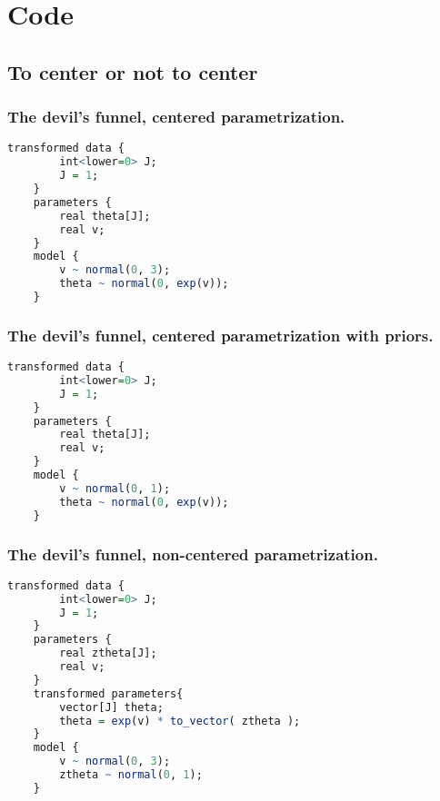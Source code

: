 \chapter{Code}

\section{To center or not to center} \label{app:noncenter}

\subsection{The devil's funnel, centered parametrization.} 
\begin{lstlisting}[language=R]
	transformed data {
		int<lower=0> J;
		J = 1;
	}
	parameters {
		real theta[J];
		real v;
	}
	model {
		v ~ normal(0, 3);
		theta ~ normal(0, exp(v));
	}
\end{lstlisting}


\subsection{The devil's funnel, centered parametrization with priors.} 
\begin{lstlisting}[language=R]
	transformed data {
		int<lower=0> J;
		J = 1;
	}
	parameters {
		real theta[J];
		real v;
	}
	model {
		v ~ normal(0, 1);
		theta ~ normal(0, exp(v));
	}
\end{lstlisting}


\subsection{The devil's funnel, non-centered parametrization.} 
\begin{lstlisting}[language=R]
	transformed data {
		int<lower=0> J;
		J = 1;
	}
	parameters {
		real ztheta[J];
		real v;
	}
	transformed parameters{
		vector[J] theta;
		theta = exp(v) * to_vector( ztheta );
	}
	model {
		v ~ normal(0, 3);
		ztheta ~ normal(0, 1);
	}
\end{lstlisting}